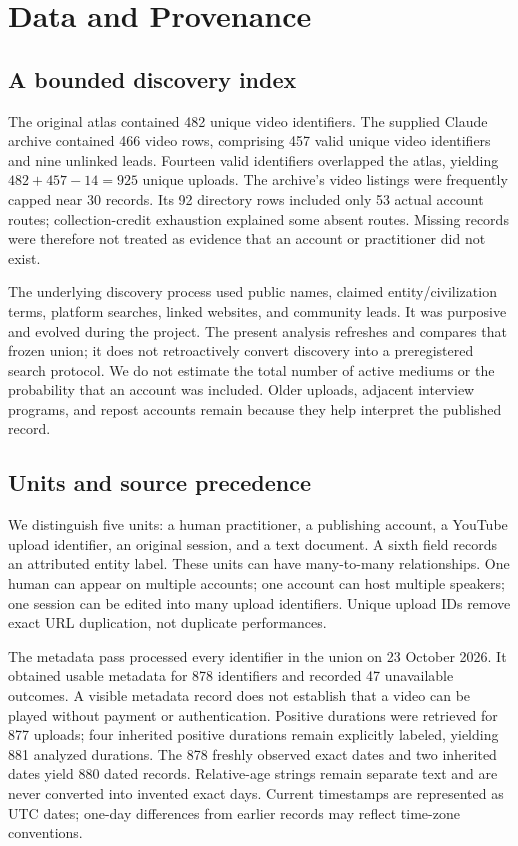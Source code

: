 \section{Data and Provenance}
\subsection{A bounded discovery index}
The original atlas contained 482 unique video identifiers. The supplied Claude archive contained 466 video rows, comprising 457 valid unique video identifiers and nine unlinked leads. Fourteen valid identifiers overlapped the atlas, yielding $482+457-14=925$ unique uploads. The archive's video listings were frequently capped near 30 records. Its 92 directory rows included only 53 actual account routes; collection-credit exhaustion explained some absent routes. Missing records were therefore not treated as evidence that an account or practitioner did not exist.

The underlying discovery process used public names, claimed entity/civilization terms, platform searches, linked websites, and community leads. It was purposive and evolved during the project. The present analysis refreshes and compares that frozen union; it does not retroactively convert discovery into a preregistered search protocol. We do not estimate the total number of active mediums or the probability that an account was included. Older uploads, adjacent interview programs, and repost accounts remain because they help interpret the published record.

\subsection{Units and source precedence}
We distinguish five units: a human practitioner, a publishing account, a YouTube upload identifier, an original session, and a text document. A sixth field records an attributed entity label. These units can have many-to-many relationships. One human can appear on multiple accounts; one account can host multiple speakers; one session can be edited into many upload identifiers. Unique upload IDs remove exact URL duplication, not duplicate performances.

The metadata pass processed every identifier in the union on 23 October 2026. It obtained usable metadata for 878 identifiers and recorded 47 unavailable outcomes. A visible metadata record does not establish that a video can be played without payment or authentication. Positive durations were retrieved for 877 uploads; four inherited positive durations remain explicitly labeled, yielding 881 analyzed durations. The 878 freshly observed exact dates and two inherited dates yield 880 dated records. Relative-age strings remain separate text and are never converted into invented exact days. Current timestamps are represented as UTC dates; one-day differences from earlier records may reflect time-zone conventions.

